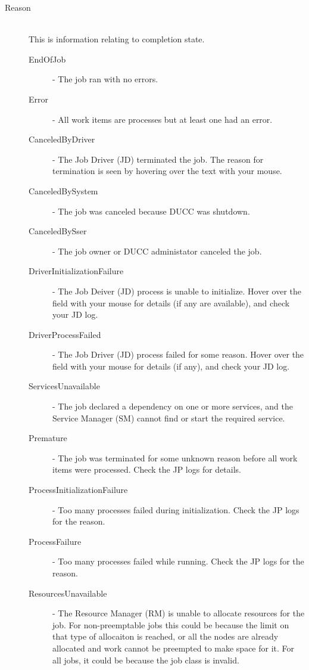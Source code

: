 \begin{description}
            \item[Reason] \hfill \\
              This is information relating to completion state.          
              \begin{description}
                  \item[EndOfJob] - The job ran with no errors. 
                  \item[Error] - All work items are processes but at least one had an error. 
                  \item[CanceledByDriver] - The Job Driver (JD) terminated the job. The reason for termination is 
                    seen by hovering over the text with your mouse. 
                  \item[CanceledBySystem] - The job was canceled because DUCC was shutdown. 
                  \item[CanceledBySser] - The job owner or DUCC administator canceled the job. 
                  \item[DriverInitializationFailure] - The Job Deiver (JD) process is unable to initialize. Hover over 
                    the field with your mouse for details (if any are available), and check your JD log. 
                  \item[DriverProcessFailed] - The Job Driver (JD) process failed for some reason. Hover over the 
                    field with your mouse for details (if any), and check your JD log. 
                  \item[ServicesUnavailable] - The job declared a dependency on one or more services, and the 
                    Service Manager (SM) cannot find or start the required service. 
                  \item[Premature] - The job was terminated for some unknown reason before all work items were 
                    processed. Check the JP logs for details. 
                  \item[ProcessInitializationFailure] - Too many processes failed during initialization. Check the JP 
                    logs for the reason. 
                  \item[ProcessFailure] - Too many processes failed while running. Check the JP logs for the reason. 
                  \item[ResourcesUnavailable] - The Resource Manager (RM) is unable to allocate resources for 
                    the job. For non-preemptable jobs this could be because the limit on that type of allocaiton is 
                    reached, or all the nodes are already allocated and work cannot be preempted to make space for 
                    it. For all jobs, it could be because the job class is invalid. 
              \end{description}



\end{description}
